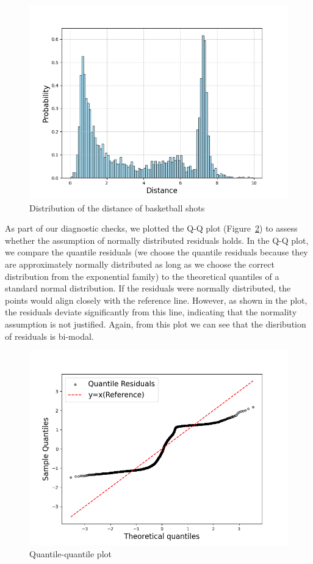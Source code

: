\documentclass[9pt]{IEEEtran}
\begin{document}
\begin{figure}[h]
    \centering
    \includegraphics[width=0.99\columnwidth]{figures/distr.png}
    \caption{Distribution of the distance of basketball shots}
    \label{fig:distr}
\end{figure}


As part of our diagnostic checks, we plotted the Q-Q plot
 (Figure~\ref{fig:qq}) to assess whether the assumption of normally
  distributed residuals holds. In the Q-Q plot, we compare the quantile
   residuals (we choose the quantile residuals because they are approximately normally distributed as 
   long as we choose the correct distribution from the exponential family)
    to the theoretical quantiles of a standard normal distribution.
    If the residuals were normally distributed, the points would align closely
     with the reference line. However, as shown in the plot, the residuals
      deviate significantly from this line, indicating that the normality 
      assumption is not justified. Again, from this plot we can see that the disribution 
      of residuals is bi-modal.


\begin{figure}[h]
    \centering
    \includegraphics[width=0.99\columnwidth]{figures/qq.png}
    \caption{Quantile-quantile plot}
    \label{fig:qq}
\end{figure}
\end{document}
